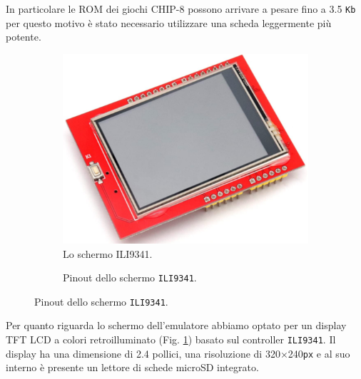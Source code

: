 \documentclass[a4paper]{article}
\begin{document}
In particolare le ROM dei giochi CHIP-8 possono arrivare a pesare
fino a 3.5 \texttt{Kb} per questo motivo è stato necessario utilizzare
una scheda leggermente più potente.

\begin{figure}[h!t]
    \begin{subfigure}[b]{0.45\textwidth}
        \begin{center}
            \includegraphics[scale=0.30]{figures/ili9341.png}
        \end{center}
        \caption{Lo schermo ILI9341.}
        \label{fig:ili9341}
    \end{subfigure}
    \hfill
    \begin{subfigure}[b]{0.45\textwidth}
        \begin{center}
            \begin{tikzpicture}[x=0.015cm, y=0.015cm, scale=0.65, transform shape]
                
            \end{tikzpicture}
        \end{center}
        \caption{Pinout dello schermo \texttt{ILI9341}.}
        \label{fig:pinout_ili}
    \end{subfigure}
\end{figure}

Per quanto riguarda lo schermo dell'emulatore abbiamo optato per un display TFT LCD
a colori retroilluminato (Fig. \ref{fig:ili9341}) basato sul controller \texttt{ILI9341}.
Il display ha una dimensione di 2.4 pollici, una risoluzione di 320$\times$240\texttt{px} e
al suo interno è presente un lettore di schede microSD integrato.
\end{document}
